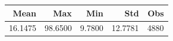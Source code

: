 \begin{tabular}{rrrrr}
\toprule
Mean & Max & Min & Std & Obs \\
\midrule
16.1475 & 98.6500 & 9.7800 & 12.7781 & 4880 \\
\bottomrule
\end{tabular}
